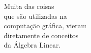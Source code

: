 \documentclass[preview]{standalone}
\begin{document}
\begin{center}
Muita das coisas\\que são utilizadas na\\computação gráfica, vieram\\diretamente de conceitos\\da Álgebra Linear.
\end{center}
\end{document}
